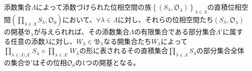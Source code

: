 \documentclass[dvipdfmx]{jsarticle}
\begin{document}
\begin{thm}\label{8.1.4.19}
添数集合$\varLambda$によって添数づけられた位相空間の族$\left\{ \left( S_{\lambda},\mathfrak{O}_{\lambda} \right) \right\}_{\lambda \in \varLambda}$の直積位相空間$\left( \prod_{\lambda \in \varLambda} S_{\lambda},\mathfrak{O}_{0} \right)$において、$\forall\lambda \in \varLambda$に対し、それらの位相空間たち$\left( S_{\lambda},\mathfrak{O}_{\lambda} \right)$の開基$\mathfrak{B}_{\lambda}$が与えられれば、その添数集合$\varLambda$の有限集合である部分集合$\varLambda'$に属する任意の添数$\lambda$に対し、$W_{\lambda} \in \mathfrak{B}_{\lambda}$なる開集合たち$W_{\lambda}$によって$\prod_{\lambda \in \varLambda \setminus \varLambda'} S_{\lambda} \times \prod_{\lambda \in \varLambda'} W_{\lambda}$の形に表されるその直積集合$\prod_{\lambda \in \varLambda} S_{\lambda}$の部分集合全体の集合$\mathfrak{B}'$はその位相$\mathfrak{O}_{0}$の1つの開基となる。
\end{thm}
\end{document}
